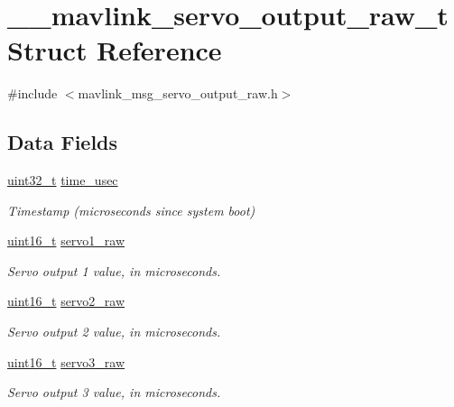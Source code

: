\hypertarget{struct____mavlink__servo__output__raw__t}{\section{\-\_\-\-\_\-mavlink\-\_\-servo\-\_\-output\-\_\-raw\-\_\-t Struct Reference}
\label{struct____mavlink__servo__output__raw__t}
}


{\ttfamily \#include $<$mavlink\-\_\-msg\-\_\-servo\-\_\-output\-\_\-raw.\-h$>$}

\subsection*{Data Fields}
\begin{DoxyCompactItemize}
\item 
\hyperlink{stdint_8h_a435d1572bf3f880d55459d9805097f62}{uint32\-\_\-t} \hyperlink{struct____mavlink__servo__output__raw__t_a77950505a736593e2c35132a1688c8f1}{time\-\_\-usec}
\begin{DoxyCompactList}\small\item\em Timestamp (microseconds since system boot) \end{DoxyCompactList}\item 
\hyperlink{stdint_8h_a273cf69d639a59973b6019625df33e30}{uint16\-\_\-t} \hyperlink{struct____mavlink__servo__output__raw__t_a5651abf79f8df0da7407b2329fedcdb2}{servo1\-\_\-raw}
\begin{DoxyCompactList}\small\item\em Servo output 1 value, in microseconds. \end{DoxyCompactList}\item 
\hyperlink{stdint_8h_a273cf69d639a59973b6019625df33e30}{uint16\-\_\-t} \hyperlink{struct____mavlink__servo__output__raw__t_aa19900df91d866a507cf3261d4b6aeda}{servo2\-\_\-raw}
\begin{DoxyCompactList}\small\item\em Servo output 2 value, in microseconds. \end{DoxyCompactList}\item 
\hyperlink{stdint_8h_a273cf69d639a59973b6019625df33e30}{uint16\-\_\-t} \hyperlink{struct____mavlink__servo__output__raw__t_a8aa15f79b56b08694b77bfa6d1788554}{servo3\-\_\-raw}
\begin{DoxyCompactList}\small\item\em Servo output 3 value, in microseconds. \end{DoxyCompactList}\item 

\end{DoxyCompactItemize}
